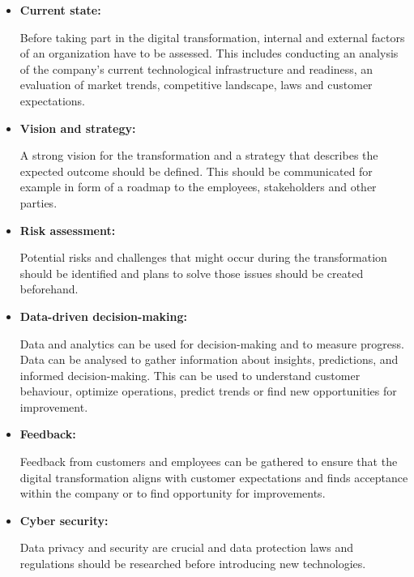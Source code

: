 \documentclass[a4]{scrartcl}
\begin{document}
\begin{itemize}
	

\item \textbf{Current state:}

Before taking part in the digital transformation, internal and external factors of an organization have to be assessed. This includes conducting an analysis of the company's current technological infrastructure and readiness, an evaluation of market trends, competitive landscape, laws and customer expectations. \cite{air, tips2}



\item \textbf{Vision and strategy:} 

A strong vision for the transformation and a strategy that describes the expected outcome should be defined. This should be communicated for example in form of a roadmap to the employees, stakeholders and other parties.~\cite{tips2, digitalmatrix, leadingdigital}




\item \textbf{Risk assessment:} 

Potential risks and challenges that might occur during the transformation should be identified and plans to solve those issues should be created beforehand. \cite{tips2, tips1}

	
\item \textbf{Data-driven decision-making:} 

Data and analytics can be used for decision-making and to measure progress. Data can be analysed to gather information about insights, predictions, and informed decision-making. This can be used to understand customer behaviour, optimize operations, predict trends or find new opportunities for improvement.~\cite{DDDM, masterthesis}


\item \textbf{Feedback:} 

Feedback from customers and employees can be gathered to ensure that the digital transformation aligns with customer expectations and finds acceptance within the company or to find opportunity for improvements. \cite{tips2}
	
	
\item \textbf{Cyber security:} 

Data privacy and security are crucial and data protection laws and regulations should be researched before introducing new technologies.~\cite{digitalmatrix, wiwi}

	


\end{itemize}
\end{document}
